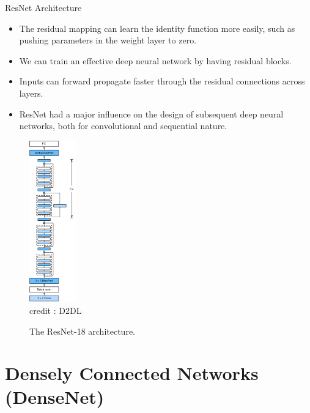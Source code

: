 \begin{vbframe}{ResNet Architecture}
    \begin{itemize}
        \item The residual mapping can learn the identity function more easily, such as pushing parameters in the weight layer to zero.
        \item We can train an effective deep neural network by having residual blocks.
        \item Inputs can forward propagate faster through the residual connections across layers.
        \item ResNet had a major influence on the design of subsequent deep neural networks, both for convolutional and sequential nature.
    \end{itemize}
    
     \begin{figure}
  \centering
    \includegraphics[width=2cm]{plots/moderncnn/resnet18.png}
    \tiny{\\ credit : D2DL}
    \caption{The ResNet-18 architecture.}
  \end{figure}
  
 \end{vbframe}

\section{Densely Connected Networks (DenseNet)}

